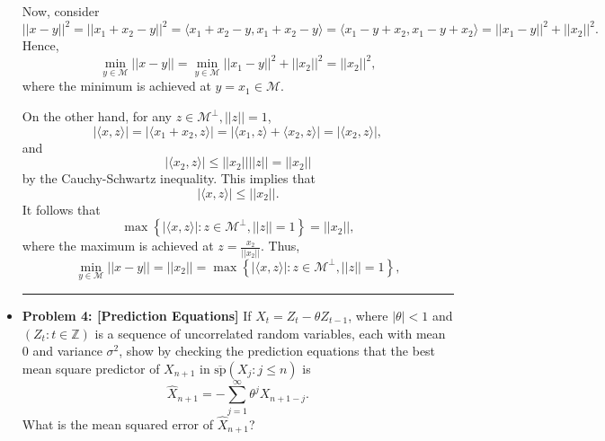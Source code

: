 \documentclass[a4paper, 11pt]{article}
\begin{document}
\begin{itemize}
	Now, consider
	$$||x-y||^2 = ||x_1+x_2 - y||^2 = \langle x_1+x_2-y, x_1+x_2-y\rangle = \langle x_1-y+x_2, x_1-y+x_2\rangle = ||x_1-y||^2 + ||x_2||^2. $$
	Hence, 
	$$ \underset{y\in\mathcal{M}}{\min}||x-y|| = \underset{y\in\mathcal{M}}{\min}||x_1-y||^2 + ||x_2||^2 = ||x_2||^2,$$
	where the minimum is achieved at $y = x_1\in\mathcal{M}$. \newline 
	
	On the other hand, for any $z\in \mathcal{M}^\bot, ||z||=1$,  
	$$|\langle x,z \rangle | = |\langle x_1+x_2,z \rangle | = |\langle x_1,z \rangle +\langle x_2,z \rangle | = |\langle x_2,z \rangle |,  $$
	and 
	$$|\langle x_2,z \rangle |\leq ||x_2|| ||z|| = ||x_2|| $$
	by the Cauchy-Schwartz inequality. This implies that 
	$$|\langle x,z \rangle | \leq ||x_2||. $$
		It follows that 
	$$\max\left\{|\langle x,z\rangle|: z\in \mathcal{M}^\bot, ||z|| = 1  \right\} = ||x_2||,$$
	where the maximum is achieved at $z = \frac{x_2}{||x_2||}$. \newline 
	Thus, 
	$$\underset{y\in\mathcal{M}}{\min}||x-y|| = ||x_2|| = \max\left\{|\langle x,z\rangle|: z\in \mathcal{M}^\bot, ||z|| = 1  \right\} ,$$
	\hrule 
	\item \textbf{Problem 4: [Prediction Equations]} If $X_t = Z_t - \theta Z_{t-1}$, where $|\theta| <1$ and $(Z_t: t\in\mathbb{Z})$ is a sequence of uncorrelated random variables, each with mean 0 and variance $\sigma^2$, show by checking the prediction equations that the best mean square predictor of $X_{n+1}$ in $\overline{\text{sp}}(X_j: j \leq n)$ is 
	$$\hat{X}_{n+1} = -\sum_{j=1}^\infty \theta^j X_{n+1-j}. $$
	What is the mean squared error of $\hat{X}_{n+1}$?


\end{itemize}
\end{document}
